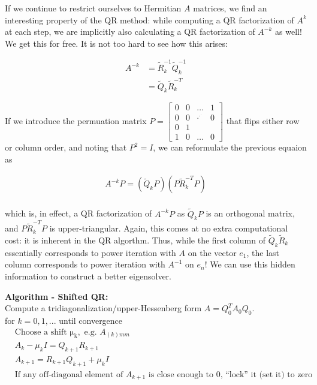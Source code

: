 \documentclass[11pt]{article}
\def\rddots{\cdot^{\cdot^{\cdot}}}
\begin{document}
If we continue to restrict ourselves to Hermitian $A$ matrices, we find an interesting property of the QR method: while computing a QR factorization of $A^k$ at each step, we are implicitly also calculating a QR factorization of $A^{-k}$ as well! We get this for free. It is not too hard to see how this arises:

\begin{align*}
  A^{-k} &= \tilde{R}_k^{-1} \tilde{Q}_k^{-1} \\
  &= \tilde{Q}_k \tilde{R}_k^{-T}
\end{align*}

If we introduce the permuation matrix $P = \begin{bmatrix} 0 & 0 & \hdots & 1 \\ 0 & 0 & \rddots & 0 \\ 0 & 1 & & \\ 1 & 0 & \hdots & 0 \end{bmatrix}$ that flips either row or column order, and noting that $P^2 = I$, we can reformulate the previous equaion as

\begin{align*}
  A^{-k}P = (\tilde{Q}_k P) (P\tilde{R}_k^{-T}P) \\
\end{align*}

which is, in effect, a QR factorization of $A^{-k}P$ as $\tilde{Q}_k P$ is an orthogonal matrix, and $P\tilde{R}_k^{-T}P$ is upper-triangular. Again, this comes at no extra computational cost: it is inherent in the QR algorthm. Thus, while the first column of $\tilde{Q}_k \tilde{R}_k$ essentially corresponds to power iteration with $A$ on the vector $e_1$, the last column corresponds to power iteration with $A^{-1}$ on $e_n$! We can use this hidden information to construct a better eigensolver. \\

\begin{framed}
\textbf{Algorithm - Shifted QR:} \\
\hspace{5mm} Compute a tridiagonalization/upper-Hessenberg form $A = Q_0^T A_0 Q_0$. \\
\hspace{5mm} for $k=0,1,...$ until convergence
\begin{align*}
  &\textrm{Choose a shift } \mathrm{\mu_k}, \textrm{ e.g. } A_{(k) mm} \\
  &A_k - \mu_k I = Q_{k+1} R_{k+1} \\
  &A_{k+1} = R_{k+1} Q_{k+1} + \mu_k I \\
  &\textrm{If any off-diagonal element of } A_{k+1} \textrm{ is close enough to 0, ``lock'' it (set it) to zero}
\end{align*}
\end{framed}
\end{document}
